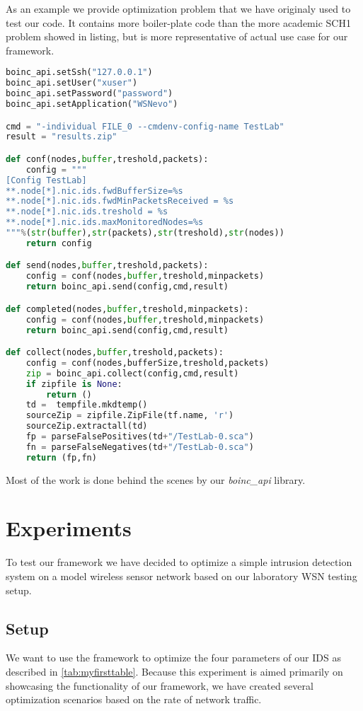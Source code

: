 \documentclass[12pt,oneside]{fithesis2}
\begin{document}
As an example we provide optimization problem that we have originaly used to test our code. It contains more boiler-plate code than the more academic SCH1 problem showed in listing, but is more representative of actual use case for our framework.

\begin{lstlisting}[language=Python,label=boinc_example,caption=Example usage of boinc]
boinc_api.setSsh("127.0.0.1")
boinc_api.setUser("xuser")
boinc_api.setPassword("password")
boinc_api.setApplication("WSNevo")

cmd = "-individual FILE_0 --cmdenv-config-name TestLab"
result = "results.zip"

def conf(nodes,buffer,treshold,packets):
    config = """
[Config TestLab]
**.node[*].nic.ids.fwdBufferSize=%s
**.node[*].nic.ids.fwdMinPacketsReceived = %s
**.node[*].nic.ids.treshold = %s
**.node[*].nic.ids.maxMonitoredNodes=%s
"""%(str(buffer),str(packets),str(treshold),str(nodes))
    return config

def send(nodes,buffer,treshold,packets):
    config = conf(nodes,buffer,treshold,minpackets)
    return boinc_api.send(config,cmd,result)

def completed(nodes,buffer,treshold,minpackets):
    config = conf(nodes,buffer,treshold,minpackets)
    return boinc_api.send(config,cmd,result)

def collect(nodes,buffer,treshold,packets):
    config = conf(nodes,bufferSize,treshold,packets)
    zip = boinc_api.collect(config,cmd,result)
    if zipfile is None:
        return ()
    td =  tempfile.mkdtemp()
    sourceZip = zipfile.ZipFile(tf.name, 'r')
    sourceZip.extractall(td)
    fp = parseFalsePositives(td+"/TestLab-0.sca")
    fn = parseFalseNegatives(td+"/TestLab-0.sca")
    return (fp,fn)
\end{lstlisting}

Most of the work is done behind the scenes by our \emph{boinc\_api} library.

\chapter{Experiments}
\label{chap:exp}
To test our framework we have decided to optimize a simple intrusion detection system on a model wireless sensor network based on our laboratory WSN testing setup.

\section{Setup}
We want to use the framework to optimize the four parameters of our IDS as described in \ref{tab:myfirsttable}. 
Because this experiment is aimed primarily on showcasing the functionality of our framework, we have created several optimization scenarios based on the rate of network traffic.
\end{document}
